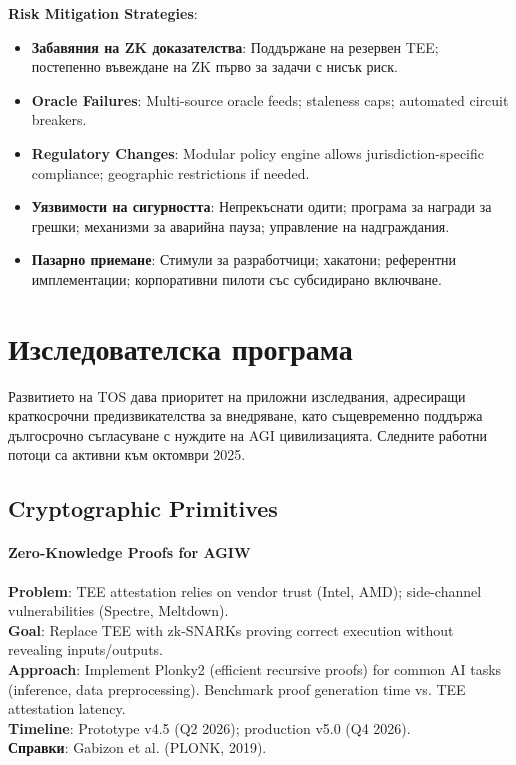 \documentclass[11pt]{article}
\begin{document}
\textbf{Risk Mitigation Strategies}:
\begin{itemize}[noitemsep]
  \item \textbf{Забавяния на ZK доказателства}: Поддържане на резервен TEE; постепенно въвеждане на ZK първо за задачи с нисък риск.
  \item \textbf{Oracle Failures}: Multi-source oracle feeds; staleness caps; automated circuit breakers.
  \item \textbf{Regulatory Changes}: Modular policy engine allows jurisdiction-specific compliance; geographic restrictions if needed.
  \item \textbf{Уязвимости на сигурността}: Непрекъснати одити; програма за награди за грешки; механизми за аварийна пауза; управление на надграждания.
  \item \textbf{Пазарно приемане}: Стимули за разработчици; хакатони; референтни имплементации; корпоративни пилоти със субсидирано включване.
\end{itemize}

\section{Изследователска програма}
\label{sec:research}

Развитието на TOS дава приоритет на приложни изследвания, адресиращи краткосрочни предизвикателства за внедряване, като същевременно поддържа дългосрочно съгласуване с нуждите на AGI цивилизацията. Следните работни потоци са активни към октомври 2025.

\subsection{Cryptographic Primitives}

\paragraph{Zero-Knowledge Proofs for AGIW}
\textbf{Problem}: TEE attestation relies on vendor trust (Intel, AMD); side-channel vulnerabilities (Spectre, Meltdown).\\
\textbf{Goal}: Replace TEE with zk-SNARKs proving correct execution without revealing inputs/outputs.\\
\textbf{Approach}: Implement Plonky2 (efficient recursive proofs) for common AI tasks (inference, data preprocessing). Benchmark proof generation time vs. TEE attestation latency.\\
\textbf{Timeline}: Prototype v4.5 (Q2 2026); production v5.0 (Q4 2026).\\
\textbf{Справки}: Gabizon et al. (PLONK, 2019).
\end{document}
